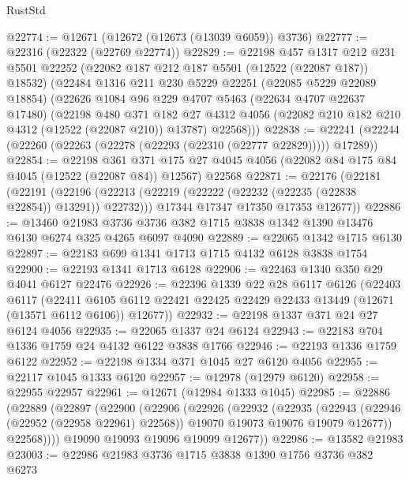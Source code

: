 \begin{lexlean}{RustStd}
\begin{coremodule}
@22774 := @12671 (@12672 (@12673 (@13039 @6059)) @3736)
@22777 := @22316 (@22322 (@22769 @22774))
@22829 := @22198
    @457
    @1317
    @212
    @231
    @5501
    @22252
    (@22082 @187 @212 @187 @5501 (@12522 (@22087 @187)) @18532)
    (@22484
      @1316
      @211
      @230
      @5229
      @22251
      (@22085 @5229 @22089 @18854)
      (@22626
        @1084
        @96
        @229
        @4707
        @5463
        (@22634 @4707 @22637 @17480)
        (@22198
          @480
          @371
          @182
          @27
          @4312
          @4056
          (@22082 @210 @182 @210 @4312 (@12522 (@22087 @210)) @13787)
          @22568)))
@22838 := @22241 (@22244 (@22260 (@22263 (@22278 (@22293 (@22310 (@22777 @22829))))) @17289))
@22854 := @22198
    @361
    @371
    @175
    @27
    @4045
    @4056
    (@22082 @84 @175 @84 @4045 (@12522 (@22087 @84)) @12567)
    @22568
@22871 := @22176
    (@22181
      (@22191
        (@22196 (@22213 (@22219 (@22222 (@22232 (@22235 (@22838 @22854)) @13291)) @22732)))
        @17344
        @17347
        @17350
        @17353
        @12677))
@22886 := @13460
    @21983
    @3736
    @3736
    @382
    @1715
    @3838
    @1342
    @1390
    @13476
    @6130
    @6274
    @325
    @4265
    @6097
    @4090
@22889 := @22065 @1342 @1715 @6130
@22897 := @22183 @699 @1341 @1713 @1715 @4132 @6128 @3838 @1754
@22900 := @22193 @1341 @1713 @6128
@22906 := @22463 @1340 @350 @29 @4041 @6127 @22476
@22926 := @22396
    @1339
    @22
    @28
    @6117
    @6126
    (@22403
      @6117
      (@22411 @6105 @6112 @22421 @22425 @22429 @22433 @13449 (@12671 (@13571 @6112 @6106)) @12677))
@22932 := @22198 @1337 @371 @24 @27 @6124 @4056
@22935 := @22065 @1337 @24 @6124
@22943 := @22183 @704 @1336 @1759 @24 @4132 @6122 @3838 @1766
@22946 := @22193 @1336 @1759 @6122
@22952 := @22198 @1334 @371 @1045 @27 @6120 @4056
@22955 := @22117 @1045 @1333 @6120
@22957 := @12978 (@12979 @6120)
@22958 := @22955 @22957
@22961 := @12671 (@12984 @1333 @1045)
@22985 := @22886
    (@22889
      (@22897
        (@22900
          (@22906
            (@22926
              (@22932
                (@22935
                  (@22943
                    (@22946 (@22952 (@22958 @22961) @22568))
                    @19070
                    @19073
                    @19076
                    @19079
                    @12677))
                @22568))))
        @19090
        @19093
        @19096
        @19099
        @12677))
@22986 := @13582 @21983
@23003 := @22986
    @21983
    @3736
    @1715
    @3838
    @1390
    @1756
    @3736
    @382
    @6273

\end{coremodule}
\end{lexlean}
